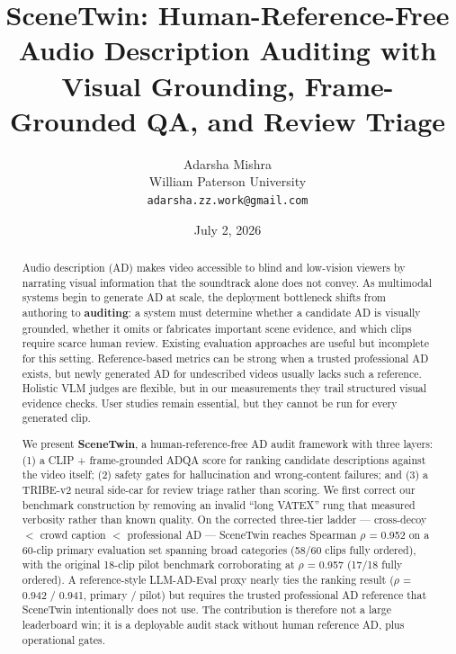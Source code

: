 \documentclass[10pt,twocolumn]{article}
\title{\textbf{SceneTwin: Human-Reference-Free Audio Description Auditing with Visual Grounding, Frame-Grounded QA, and Review Triage}}
\author{Adarsha Mishra\\William Paterson University\\\texttt{adarsha.zz.work@gmail.com}}
\date{July 2, 2026}
\begin{document}
\maketitle
\begin{abstract}
Audio description (AD) makes video accessible to blind and low-vision viewers by narrating visual information that the soundtrack alone does not convey. As multimodal systems begin to generate AD at scale, the deployment bottleneck shifts from authoring to \textbf{auditing}: a system must determine whether a candidate AD is visually grounded, whether it omits or fabricates important scene evidence, and which clips require scarce human review. Existing evaluation approaches are useful but incomplete for this setting. Reference-based metrics can be strong when a trusted professional AD exists, but newly generated AD for undescribed videos usually lacks such a reference. Holistic VLM judges are flexible, but in our measurements they trail structured visual evidence checks. User studies remain essential, but they cannot be run for every generated clip.

We present \textbf{SceneTwin}, a human-reference-free AD audit framework with three layers: (1) a CLIP + frame-grounded ADQA score for ranking candidate descriptions against the video itself; (2) safety gates for hallucination and wrong-content failures; and (3) a TRIBE-v2 neural side-car for review triage rather than scoring. We first correct our benchmark construction by removing an invalid ``long VATEX'' rung that measured verbosity rather than known quality. On the corrected three-tier ladder --- cross-decoy $<$ crowd caption $<$ professional AD --- SceneTwin reaches Spearman $\rho$ = 0.952 on a 60-clip primary evaluation set spanning broad categories (58/60 clips fully ordered), with the original 18-clip pilot benchmark corroborating at $\rho$ = 0.957 (17/18 fully ordered). A reference-style LLM-AD-Eval proxy nearly ties the ranking result ($\rho$ = 0.942 / 0.941, primary / pilot) but requires the trusted professional AD reference that SceneTwin intentionally does not use. The contribution is therefore not a large leaderboard win; it is a deployable audit stack without human reference AD, plus operational gates.


\end{abstract}
\end{document}
